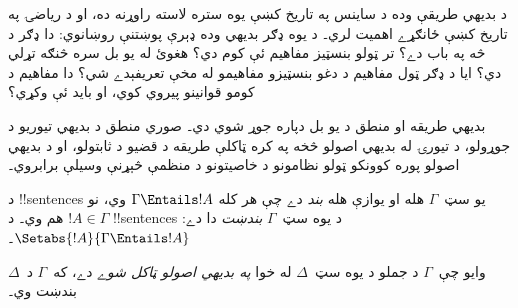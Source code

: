 \documentclass[../../../include/open-logic-section]{subfiles}
\begin{document}

\begin{explain}
د بديهي طريقې وده د ساينس په تاريخ کښې يوه ستره لاسته راوړنه ده،
او د رياضۍ په تاريخ کښې ځانګړے اهميت لري۔ د يوه ډګر بديهي وده ډېرې
پوښتنې روښانوي: دا ډګر د څه په باب دے؟ تر ټولو بنسټيز مفاهيم ئې کوم
دي؟ هغوئ له يو بل سره څنګه تړلي دي؟ ايا د ډګر ټول مفاهيم د دغو
بنسټيزو مفاهيمو له مخې تعريفېدے شي؟ دا مفاهيم د کومو قوانينو پيروي
کوي، او بايد ئې وکړي؟

بديهي طريقه او منطق د يو بل دپاره جوړ شوي دي۔ صوري منطق د بديهي
تيوريو د جوړولو، د تيورۍ له بديهي اصولو څخه په کره ټاکلې طريقه د
قضيو د ثابتولو، او د بديهي اصولو پوره کوونکو ټولو نظامونو د خاصيتونو
د منظمې څېړنې وسيلې برابروي۔
\end{explain}

\begin{defn}
د !!{sentence}s يو سټ~$\Gamma$ هله او يوازې هله \emph{بند} دے چې
هر کله $\Gamma \Entails !A$ وي، نو $!A \in \Gamma$ هم وي۔ د
!!{sentence}s د يوه سټ~$\Gamma$ \emph{بندښت} دا دے:
$\Setabs{!A}{\Gamma \Entails !A}$۔

وايو چې~$\Gamma$ د جملو د يوه سټ~$\Delta$ له خوا \emph{په بديهي
اصولو ټاکل شوے} دے، که~$\Gamma$ د~$\Delta$ بندښت وي۔
\end{defn}
\end{document}

